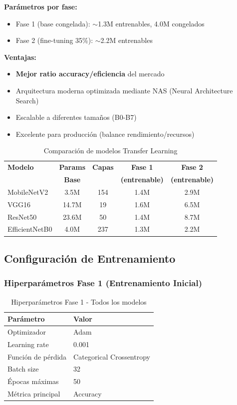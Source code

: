 \documentclass[11pt, a4paper]{article}
\begin{document}
\textbf{Parámetros por fase:}
\begin{itemize}
    \item Fase 1 (base congelada): $\sim$1.3M entrenables, 4.0M congelados
    \item Fase 2 (fine-tuning 35\%): $\sim$2.2M entrenables
\end{itemize}

\textbf{Ventajas:}
\begin{itemize}
    \item \textbf{Mejor ratio accuracy/eficiencia} del mercado
    \item Arquitectura moderna optimizada mediante NAS (Neural Architecture Search)
    \item Escalable a diferentes tamaños (B0-B7)
    \item Excelente para producción (balance rendimiento/recursos)
\end{itemize}

\begin{table}[H]
\centering
\caption{Comparación de modelos Transfer Learning}
\label{tab:tl_comparison}
\begin{tabular}{@{}lcccc@{}}
\toprule
\textbf{Modelo} & \textbf{Params} & \textbf{Capas} & \textbf{Fase 1} & \textbf{Fase 2} \\
 & \textbf{Base} &  & \textbf{(entrenable)} & \textbf{(entrenable)} \\
\midrule
MobileNetV2    & 3.5M  & 154 & 1.4M & 2.9M \\
VGG16          & 14.7M & 19  & 1.6M & 6.5M \\
ResNet50       & 23.6M & 50  & 1.4M & 8.7M \\
EfficientNetB0 & 4.0M  & 237 & 1.3M & 2.2M \\
\bottomrule
\end{tabular}
\end{table}

\subsection{Configuración de Entrenamiento}

\subsubsection{Hiperparámetros Fase 1 (Entrenamiento Inicial)}

\begin{table}[H]
\centering
\caption{Hiperparámetros Fase 1 - Todos los modelos}
\label{tab:hyperparams_phase1}
\begin{tabular}{@{}ll@{}}
\toprule
\textbf{Parámetro} & \textbf{Valor} \\
\midrule
Optimizador          & Adam \\
Learning rate        & 0.001 \\
Función de pérdida   & Categorical Crossentropy \\
Batch size           & 32 \\
Épocas máximas       & 50 \\
Métrica principal    & Accuracy \\
\bottomrule
\end{tabular}
\end{table}
\end{document}
